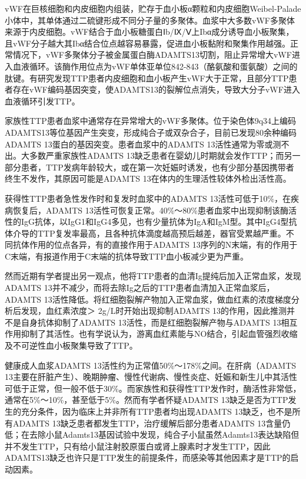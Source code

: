 vWF在巨核细胞和内皮细胞内组装，贮存于血小板α颗粒和内皮细胞Weibel-Palade小体中，其单体通过二硫键形成不同分子量的多聚体。血浆中大多数vWF多聚体来源于内皮细胞。vWF结合于血小板糖蛋白Ⅰb/Ⅸ/Ⅴ上Ibα成分诱导血小板聚集，且vWF分子越大其Ibα结合位点越容易暴露，促进血小板黏附和聚集作用越强。正常情况下，vWF多聚体分子被金属蛋白酶ADAMTS13切割，阻止异常增大vWF进入血液循环。该酶作用位点为vWF单体亚单位842-843（酪氨酸和蛋氨酸）之间的肽键。有研究发现TTP患者内皮细胞和血小板产生vWF大于正常，且部分TTP患者存在vWF编码基因突变，使ADAMTS13的裂解位点消失，导致大分子vWF进入血液循环引发TTP。

家族性TTP患者血浆中通常存在异常增大的vWF多聚体。位于染色体9q34上编码ADAMTS13等位基因产生突变，形成纯合子或双杂合子，目前已发现80余种编码ADAMTS
13蛋白的基因突变。患者血浆中的ADAMTS
13活性通常为零或测不出。大多数严重家族性ADAMTS
13缺乏患者在婴幼儿时期就会发作TTP；而另一部分患者，TTP发病年龄较大，或在第一次妊娠时诱发，也有少部分基因携带者终生不发作，其原因可能是ADAMTS
13在体内的生理活性较体外检出活性高。

获得性TTP患者急性发作时和复发时血浆中的ADAMTS
13活性可低于10\%，在疾病恢复后，ADAMTS
13活性可恢复正常。40\%～80\%患者血浆中出现抑制该酶活性的IgG抗体，以IgG1和IgG4多见，也有少量抗体为IgA和IgM型。其中IgG4型抗体介导的TTP复发率最高，且各种抗体滴度越高预后越差，器官受累越严重。不同抗体作用的位点各异，有的直接作用于ADAMTS
13序列的N末端，有的作用于C末端，有报道作用于C末端的抗体导致TTP血小板减少更为严重。

然而近期有学者提出另一观点，他将TTP患者的血清Ig提纯后加入正常血浆，发现ADAMTS
13并不减少，而将去除Ig之后的TTP患者血清加入正常血浆后，ADAMTS
13活性降低。将红细胞裂解产物加入正常血浆，做血红素的浓度梯度分析后发现，血红素浓度＞
2g/L时开始出现抑制ADAMTS 13的作用，因此推测并不是自身抗体抑制了ADAMTS
13活性，而是红细胞裂解产物与ADAMTS
13相互作用抑制了其活性。也有学说认为，游离血红素能与NO结合，引起血管强烈收缩及不可逆性血小板聚集导致了TTP。

健康成人血浆ADAMTS 13活性约为正常值50\%～178\%之间。在肝病（ADAMTS
13主要在肝脏产生）、晚期肿瘤、慢性代谢病、慢性炎症、妊娠和新生儿中其活性可低于正常，但一般不低于30\%。而家族性和获得性TTP发作时，酶活性非常低，通常在5\%～10\%，甚至低于5\%。然而有学者怀疑ADAMTS
13缺乏是否为TTP发生的充分条件，因为临床上并非所有TTP患者均出现ADAMTS
13缺乏，也不是所有ADAMTS 13缺乏患者都发生TTP，治疗缓解后部分患者ADAMTS
13含量仍低；在去除小鼠Adamts13基因试验中发现，纯合子小鼠虽然Adamts13表达缺陷但并不发生TTP，只有给小鼠注射胶原蛋白或肾上腺素时才发生TTP，因此ADAMTS13缺乏也许只是TTP发生的前提条件，而感染等其他因素才是TTP的启动因素。


